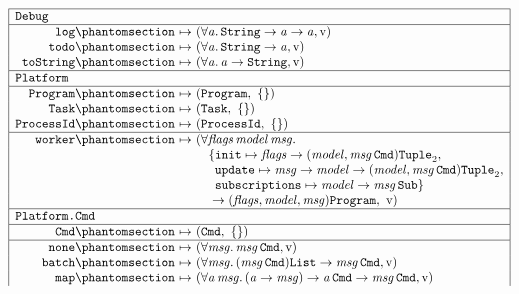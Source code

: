 \begin{figure}[htbp]
\centering
\small
\[
\begin{array}{|r@{\ }c@{\ }l|}
\hline
\multicolumn{3}{|l|}{\kw{Debug}}\\
\hline
\kw{log}\citelabel{b:Debug.log} & \mapsto & (\forall\mv{a}.\,\tString \rightarrow \mv{a} \rightarrow \mv{a}, \isv)\\
\kw{todo}\citelabel{b:Debug.todo} & \mapsto & (\forall\mv{a}.\,\tString \rightarrow \mv{a}, \isv)\\
\kw{toString}\citelabel{b:Debug.toString} & \mapsto & (\forall\mv{a}.\,\mv{a} \rightarrow \tString, \isv)\\
\hline
\multicolumn{3}{|l|}{\kw{Platform}}\\
\hline
\kw{Program}\citelabel{b:Platform.Program} & \mapsto & (\sbtProgram,\ \emptymap)\\
\kw{Task}\citelabel{b:Platform.Task} & \mapsto & (\sbtTask,\ \emptymap)\\
\kw{ProcessId}\citelabel{b:Platform.ProcessId} & \mapsto & (\sbtProcessId,\ \emptymap)\\
\hline
\kw{worker}\citelabel{b:Platform.worker} & \mapsto & (\forall\mv{flags}\,\mv{model}\,\mv{msg}.\\
 & & \quad\{\kw{init} \mapsto \mv{flags} \rightarrow (\mv{model}, \mv{msg}\,\sbtCmd)\tTuple{2},\\
 & & \quad\phantom{\{}\kw{update} \mapsto \mv{msg} \rightarrow \mv{model} \rightarrow (\mv{model}, \mv{msg}\,\sbtCmd)\tTuple{2},\\
 & & \quad\phantom{\{}\kw{subscriptions} \mapsto \mv{model} \rightarrow \mv{msg}\,\sbtSub\}\\
 & & \quad{} \rightarrow (\mv{flags}, \mv{model}, \mv{msg})\sbtProgram,\ \isv)\\
\hline
\multicolumn{3}{|l|}{\kw{Platform.Cmd}}\\
\hline
\kw{Cmd}\citelabel{b:Platform.Cmd.Cmd} & \mapsto & (\sbtCmd,\ \emptymap)\\
\hline
\kw{none}\citelabel{b:Platform.Cmd.none} & \mapsto & (\forall\mv{msg}.\,\mv{msg}\,\sbtCmd, \isv)\\
\kw{batch}\citelabel{b:Platform.Cmd.batch} & \mapsto & (\forall\mv{msg}.\,(\mv{msg}\,\sbtCmd)\tList \rightarrow \mv{msg}\,\sbtCmd, \isv)\\
\kw{map}\citelabel{b:Platform.Cmd.map} & \mapsto & (\forall\mv{a}\,\mv{msg}.\,(\mv{a} \rightarrow \mv{msg}) \rightarrow \mv{a}\,\sbtCmd \rightarrow \mv{msg}\,\sbtCmd, \isv)\\

\end{array}\]
\end{figure}
